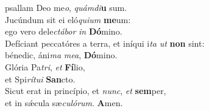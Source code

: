 \evenverse psallam Deo me\textit{o}, \textit{quám}\textit{di}\textbf{u} sum.\\
\oddverse Jucúndum sit ei eló\textit{qui}\textit{um} \textbf{me}um:~\*\\
\oddverse ego vero dele\textit{ctá}\textit{bor} \textit{in} \textbf{Dó}mino.\\
\evenverse Defíciant peccatóres a terra, et iníqui i\textit{ta} \textit{ut} \textbf{non} sint:~\*\\
\evenverse bénedic, áni\textit{ma} \textit{me}\textit{a}, \textbf{Dó}mino.\\
\oddverse Glória Pa\textit{tri}, \textit{et} \textbf{Fí}lio,~\*\\
\oddverse et Spi\textit{rí}\textit{tu}\textit{i} \textbf{San}cto.\\
\evenverse Sicut erat in princípio, et \textit{nunc}, \textit{et} \textbf{sem}per,~\*\\
\evenverse et in sǽcula sæ\textit{cu}\textit{ló}\textit{rum}. \textbf{A}men.\\
